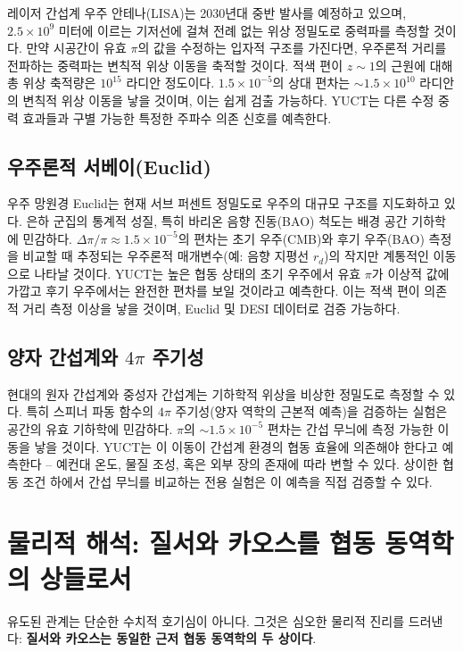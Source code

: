 \documentclass[11pt,a4paper]{article}
\begin{document}
	레이저 간섭계 우주 안테나(LISA)는 2030년대 중반 발사를 예정하고 있으며, \(2.5\times10^9\) 미터에 이르는 기저선에 걸쳐 전례 없는 위상 정밀도로 중력파를 측정할 것이다. 만약 시공간이 유효 \(\pi\)의 값을 수정하는 입자적 구조를 가진다면, 우주론적 거리를 전파하는 중력파는 변칙적 위상 이동을 축적할 것이다. 적색 편이 \(z \sim 1\)의 근원에 대해 총 위상 축적량은 \(10^{15}\) 라디안 정도이다. \(1.5\times10^{-5}\)의 상대 편차는 \(\sim 1.5\times10^{10}\) 라디안의 변칙적 위상 이동을 낳을 것이며, 이는 쉽게 검출 가능하다. YUCT는 다른 수정 중력 효과들과 구별 가능한 특정한 주파수 의존 신호를 예측한다.
	
	\subsection{우주론적 서베이(Euclid)}
	
	우주 망원경 Euclid는 현재 서브 퍼센트 정밀도로 우주의 대규모 구조를 지도화하고 있다. 은하 군집의 통계적 성질, 특히 바리온 음향 진동(BAO) 척도는 배경 공간 기하학에 민감하다. \(\Delta\pi/\pi \approx 1.5\times10^{-5}\)의 편차는 초기 우주(CMB)와 후기 우주(BAO) 측정을 비교할 때 추정되는 우주론적 매개변수(예: 음향 지평선 \(r_d\))의 작지만 계통적인 이동으로 나타날 것이다. YUCT는 높은 협동 상태의 초기 우주에서 유효 \(\pi\)가 이상적 값에 가깝고 후기 우주에서는 완전한 편차를 보일 것이라고 예측한다. 이는 적색 편이 의존적 거리 측정 이상을 낳을 것이며, Euclid 및 DESI 데이터로 검증 가능하다.
	
	\subsection{양자 간섭계와 \(4\pi\) 주기성}
	
	현대의 원자 간섭계와 중성자 간섭계는 기하학적 위상을 비상한 정밀도로 측정할 수 있다. 특히 스피너 파동 함수의 \(4\pi\) 주기성(양자 역학의 근본적 예측)을 검증하는 실험은 공간의 유효 기하학에 민감하다. \(\pi\)의 \(\sim 1.5\times10^{-5}\) 편차는 간섭 무늬에 측정 가능한 이동을 낳을 것이다. YUCT는 이 이동이 간섭계 환경의 협동 효율에 의존해야 한다고 예측한다 – 예컨대 온도, 물질 조성, 혹은 외부 장의 존재에 따라 변할 수 있다. 상이한 협동 조건 하에서 간섭 무늬를 비교하는 전용 실험은 이 예측을 직접 검증할 수 있다.
	
	\section{물리적 해석: 질서와 카오스를 협동 동역학의 상들로서}
	
	유도된 관계는 단순한 수치적 호기심이 아니다. 그것은 심오한 물리적 진리를 드러낸다: \textbf{질서와 카오스는 동일한 근저 협동 동역학의 두 상이다}.
	
\end{document}
